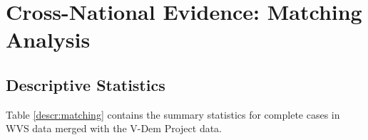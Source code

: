 \documentclass[11pt, ngerman,english,a4]{article}
\begin{document}
\newpage
\appendix
\thispagestyle{empty}
\appendixpage
\startcontents[sections]
\newpage
\renewcommand*{\thepage}{A\arabic{page}}
\renewcommand*{\thesection}{\Alph{section}.}
\renewcommand*{\thesubsection}{\alph{subsection}.}
\renewcommand\thefigure{A\arabic{figure}}   
\renewcommand\thetable{A\arabic{table}}  
\setcounter{figure}{0}
\setcounter{table}{0}
\setcounter{page}{1}





\section{Cross-National Evidence: Matching Analysis}

\subsection{Descriptive Statistics}
Table \ref{descr:matching} contains the summary statistics for complete cases in WVS data merged with the V-Dem Project data. 
\end{document}
